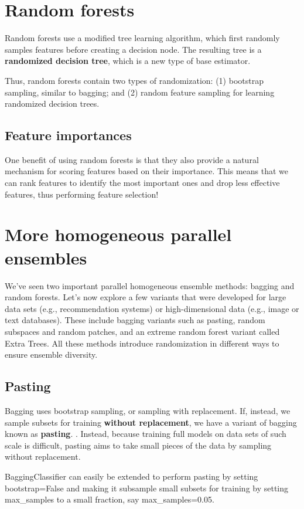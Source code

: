 \section{Random forests}
Random forests use a modified tree learning algorithm, which first randomly samples features before creating a decision node. The resulting tree is a \textbf{randomized decision tree}, which is a new type of base estimator.

Thus, random forests contain two types of randomization: (1) bootstrap sampling, similar to bagging; and (2) random feature sampling for learning randomized decision trees.

\subsection{Feature importances}
One benefit of using random forests is that they also provide a natural mechanism for scoring features based on their importance. This means that we can rank features to identify the most important ones and drop less effective features, thus performing feature selection!

\section{More homogeneous parallel ensembles}
We’ve seen two important parallel homogeneous ensemble methods: bagging and
random forests. Let’s now explore a few variants that were developed for large data
sets (e.g., recommendation systems) or high-dimensional data (e.g., image or text
databases). These include bagging variants such as pasting, random subspaces and
random patches, and an extreme random forest variant called Extra Trees. All these
methods introduce randomization in different ways to ensure ensemble diversity.
\subsection{Pasting}
Bagging uses bootstrap sampling, or sampling with replacement. If, instead, we sample subsets for training \textbf{without replacement}, we have a variant of bagging known as \textbf{pasting}. . Instead, because training full models on data sets of such scale is difficult, pasting aims to take small pieces of the data by sampling without replacement.
\begin{tcolorbox}[title=TIP]
    BaggingClassifier can easily be extended to perform pasting by setting bootstrap=False and making it subsample small subsets for training
    by setting max\_samples to a small fraction, say max\_samples=0.05.
\end{tcolorbox}

